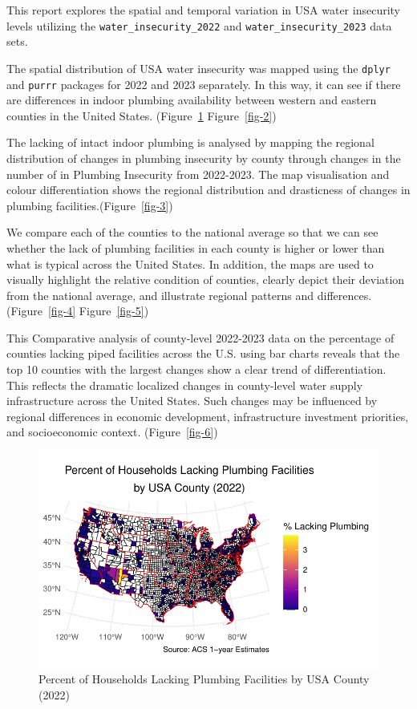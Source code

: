 \documentclass[
  letterpaper,
  DIV=11,
  numbers=noendperiod]{scrartcl}
\begin{document}
This report explores the spatial and temporal variation in USA water
insecurity levels utilizing the \texttt{water\_insecurity\_2022} and
\texttt{water\_insecurity\_2023} data sets.

The spatial distribution of USA water insecurity was mapped using the
\texttt{dplyr} and \texttt{purrr} packages for 2022 and 2023 separately.
In this way, it can see if there are differences in indoor plumbing
availability between western and eastern counties in the United States.
(Figure~\ref{fig-1} Figure~\ref{fig-2})

The lacking of intact indoor plumbing is analysed by mapping the
regional distribution of changes in plumbing insecurity by county
through changes in the number of in Plumbing Insecurity from 2022-2023.
The map visualisation and colour differentiation shows the regional
distribution and drasticness of changes in plumbing
facilities.(Figure~\ref{fig-3})

We compare each of the counties to the national average so that we can
see whether the lack of plumbing facilities in each county is higher or
lower than what is typical across the United States. In addition, the
maps are used to visually highlight the relative condition of counties,
clearly depict their deviation from the national average, and illustrate
regional patterns and differences.(Figure~\ref{fig-4}
Figure~\ref{fig-5})

This Comparative analysis of county-level 2022-2023 data on the
percentage of counties lacking piped facilities across the U.S. using
bar charts reveals that the top 10 counties with the largest changes
show a clear trend of differentiation. This reflects the dramatic
localized changes in county-level water supply infrastructure across the
United States. Such changes may be influenced by regional differences in
economic development, infrastructure investment priorities, and
socioeconomic context. (Figure~\ref{fig-6})

\begin{figure}[H]

{\centering \includegraphics{report_files/figure-pdf/fig-1-1.pdf}

}

\caption{\label{fig-1}Percent of Households Lacking Plumbing Facilities
by USA County (2022)}

\end{figure}
\end{document}
